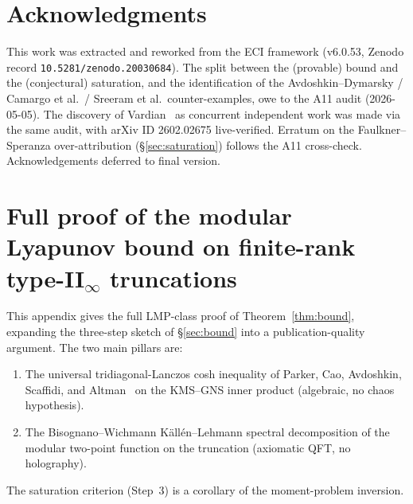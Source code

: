 \documentclass[12pt,a4paper]{article}
\begin{document}
\section*{Acknowledgments}

This work was extracted and reworked from the ECI framework
(v6.0.53, Zenodo record \texttt{10.5281/zenodo.20030684}).
The split between the (provable) bound and the (conjectural)
saturation, and the identification of the Avdoshkin--Dymarsky /
Camargo et al.\ / Sreeram et al.\ counter-examples, owe to the A11
audit (2026-05-05).
The discovery of Vardian~\cite{Vardian2026} as concurrent
independent work was made via the same audit, with arXiv ID
2602.02675 live-verified.
Erratum on the Faulkner--Speranza over-attribution (\S\ref{sec:saturation})
follows the A11 cross-check.
Acknowledgements deferred to final version.


\appendix

\section{Full proof of the modular Lyapunov bound on finite-rank
  type-II$_\infty$ truncations}
\label{app:A61-proof}


This appendix gives the full LMP-class proof of
Theorem~\ref{thm:bound}, expanding the three-step sketch of
\S\ref{sec:bound} into a publication-quality argument.
The two main pillars are:
\begin{enumerate}
\item The universal tridiagonal-Lanczos cosh inequality of Parker,
  Cao, Avdoshkin, Scaffidi, and Altman~\cite{Parker2019} on the
  KMS--GNS inner product (algebraic, no chaos hypothesis).
\item The Bisognano--Wichmann K\"{a}ll\'{e}n--Lehmann spectral
  decomposition of the modular two-point function on the truncation
  (axiomatic QFT, no holography).
\end{enumerate}
The saturation criterion (Step~3) is a corollary of the
moment-problem inversion.
\end{document}
